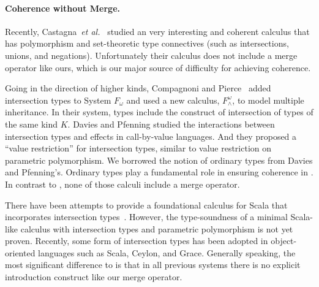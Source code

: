 \begin{comment}
 the way coherence is ensured is not general
enough. He has four different typing rules for the merge operator, each
accounting for various possibilities of what the types of the first and second
components are. In some cases the meaning of the second component takes
precedence (that is, is biased) over the first component. The set of rules is
restrictive and it forbids, for instance, the merge of two functions (even when
they a provably disjoint). Therefore, Forsythe treatment of coherence
is rather ad-hoc. In contrast, disjointness in \name has a simple, well-defined
specification and it is quite flexible.
\end{comment}

\paragraph{Coherence without Merge.}
Recently, Castagna~\textit{et al.}~\cite{Castagna:2014} studied an very interesting
and coherent calculus that has polymorphism and set-theoretic type connectives (such as
intersections, unions, and negations). Unfortunately their calculus
does not include a merge operator like ours, which is our major source
of difficulty for achieving coherence.

Going in the direction of higher
kinds, Compagnoni and Pierce~\cite{compagnoni1996higher} added
intersection types to System $ F_{\omega} $ and used a new calculus,
$ F^{\omega}_{\wedge} $, to model multiple inheritance. In their
system, types include the construct of intersection of types of the
same kind $ K $. Davies and Pfenning
\cite{davies2000intersection} studied the interactions between
intersection types and effects in call-by-value languages. And they
proposed a ``value restriction'' for intersection types, similar to
value restriction on parametric polymorphism.
We borrowed the notion of ordinary types from Davies and Pfenning's.
Ordinary types play a fundamental role in ensuring coherence in \name.
In contrast to \name, none of those calculi include a merge operator.

There have been attempts to provide a foundational calculus
for Scala that incorporates intersection
types~\cite{amin2014foundations,amin2012dependent}.
However, the type-soundness of a minimal Scala-like
calculus with intersection types and parametric polymorphism is not
yet proven. Recently, some form of intersection
types has been adopted in object-oriented languages such as Scala,
Ceylon, and Grace. Generally speaking,
the most significant difference to \name is that in all previous systems
there is no explicit introduction construct like our merge operator.

